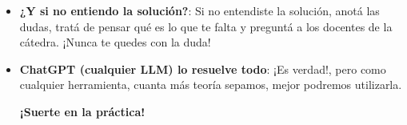 \begin{tcolorbox}[colback=yellow,colframe=red!75!black,arc=0pt,outer arc=0pt]
\begin{itemize}
\item \textbf{¿Y si no entiendo la solución?}: Si no entendiste la solución, anotá las dudas, tratá de pensar qué es
lo que te falta y preguntá a los docentes de la cátedra. ¡Nunca te quedes con la duda!

\item \textbf{ChatGPT (cualquier LLM) lo resuelve todo}: ¡Es verdad!, pero como cualquier herramienta, cuanta más teoría
  sepamos, mejor podremos utilizarla.

\textbf{¡Suerte en la práctica!}
\end{itemize}
\end{tcolorbox}
